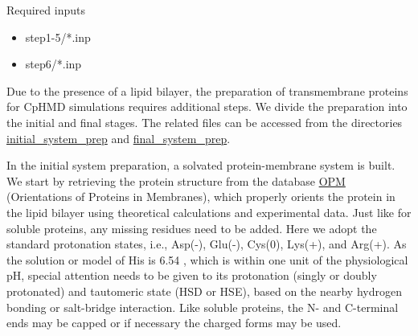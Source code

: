 \begin{checklist}{Required inputs}
 \begin{itemize}
 \item step1-5/*.inp
  \item step6/*.inp
\end{itemize}
\end{checklist}
Due to the presence of a lipid bilayer, the preparation of transmembrane proteins for CpHMD simulations requires additional steps.
We divide the preparation into the initial and final stages.
The related files can be accessed from the directories
\href{https://gitlab.com/shenlab-amber-cphmd/cphmd-tutorial/-/tree/main/memb_hphmd_charmm/initial_system_prep/}{initial\_system\_prep}
and \href{https://gitlab.com/shenlab-amber-cphmd/cphmd-tutorial/-/tree/main/memb_hphmd_charmm/final_system_prep/}{final\_system\_prep}.

In the initial system preparation, a solvated protein-membrane system is built.
We start by retrieving the protein structure from the database \href{https://opm.phar.umich.edu/}{OPM} (Orientations of Proteins in Membranes), which properly orients the protein in the lipid bilayer using theoretical calculations and experimental data.\cite{Lomize_Mosberg_2006_Bioinformatics}
Just like for soluble proteins, any missing residues need to be added.
Here we adopt the standard protonation states, i.e., Asp(-), Glu(-), Cys(0), Lys(+), and Arg(+).
As the solution or model {\pka} of His is 6.54 \cite{Thurlkill_Pace_2006_ProteinSci.}, 
which is within one unit of the physiological pH, special attention needs to be given to its protonation (singly or doubly protonated) and tautomeric state (HSD or HSE), based on the nearby hydrogen bonding or salt-bridge interaction. 
Like soluble proteins, the N- and C-terminal ends may be capped or if necessary the charged forms may be used. 

